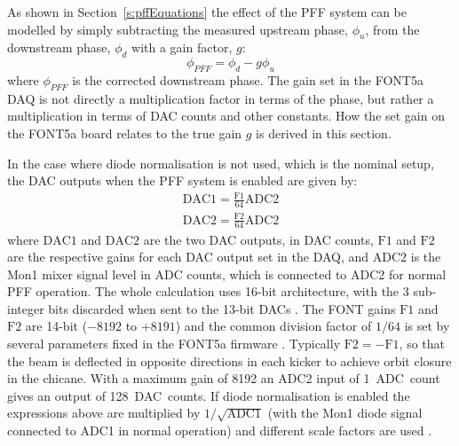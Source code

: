 As shown in Section~\ref{s:pffEquations} the effect of the PFF system can be modelled by simply subtracting the measured upstream phase, \(\phi_u\), from the downstream phase, \(\phi_d\) with a gain factor, \(g\):
\begin{equation} \label{e:realGainEqn}
\phi_{PFF} = \phi_d - g\phi_u
\end{equation}
where \(\phi_{PFF}\) is the corrected downstream phase. The gain set in the FONT5a DAQ is not directly a multiplication factor in terms of the phase, but rather a multiplication in terms of DAC counts and other constants. How the set gain on the FONT5a board relates to the true gain \(g\) is derived in this section.

In the case where diode normalisation is not used, which is the nominal setup, the DAC outputs when the PFF system is enabled are given by:
\begin{eqnarray}
\mathrm{DAC1} = \frac{\mathrm{F1}}{64}\mathrm{ADC2} \nonumber \\ 
\mathrm{DAC2} = \frac{\mathrm{F2}}{64}\mathrm{ADC2} \label{e:fontGain1}
\end{eqnarray}
where \(\mathrm{DAC1}\) and \(\mathrm{DAC2}\) are the two DAC outputs, in DAC counts, \(\mathrm{F1}\) and \(\mathrm{F2}\) are the respective gains for each DAC output set in the DAQ, and \(\mathrm{ADC2}\) is the Mon1 mixer signal level in ADC counts, which is connected to ADC2 for normal PFF operation. The whole calculation uses 16-bit architecture, with the 3 sub-integer bits discarded when sent to the 13-bit DACs \cite{glennPriv}. The FONT gains \(\mathrm{F1}\) and \(\mathrm{F2}\) are 14-bit (\(-8192\) to \(+8191\)) and the common division factor of \(1/64\) is set by several parameters fixed in the FONT5a firmware \cite{glennPriv}.
Typically \(\mathrm{F2} = -\mathrm{F1}\), so that the beam is deflected in opposite directions in each kicker to achieve orbit closure in the chicane. With a maximum gain of 8192 an ADC2 input of 1~ADC~count gives an output of 128~DAC~counts. If diode normalisation is enabled the expressions above are multiplied by \(1/\sqrt{\mathrm{ADC1}}\) (with the Mon1 diode signal connected to ADC1 in normal operation) and different scale factors are used \cite{glennPriv}.

